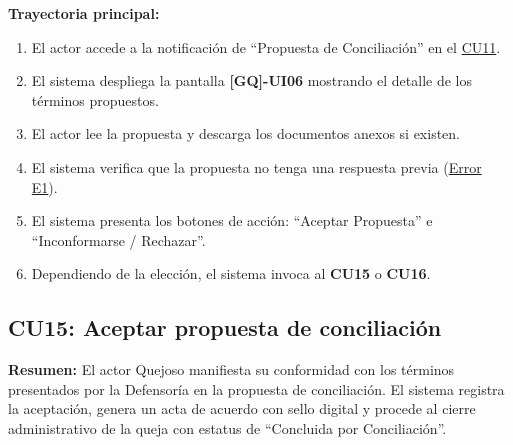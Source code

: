 \begin{appendices}
\textbf{Trayectoria principal:}
\begin{enumerate}[nosep]
    \item El actor accede a la notificación de ``Propuesta de Conciliación'' en el \hyperlink{anexo:casos_uso}{CU11}.
    \item El sistema despliega la pantalla \textbf{[GQ]-UI06} mostrando el detalle de los términos propuestos.
    \item El actor lee la propuesta y descarga los documentos anexos si existen.
    \item El sistema verifica que la propuesta no tenga una respuesta previa (\hyperlink{err:E19}{Error E1}).
    \item El sistema presenta los botones de acción: ``Aceptar Propuesta'' e ``Inconformarse / Rechazar''.
    \item Dependiendo de la elección, el sistema invoca al \textbf{CU15} o \textbf{CU16}.
\end{enumerate}


\subsection{CU15: Aceptar propuesta de conciliación}

\textbf{Resumen:} 
El actor Quejoso manifiesta su conformidad con los términos presentados por la Defensoría en la propuesta de conciliación. El sistema registra la aceptación, genera un acta de acuerdo con sello digital y procede al cierre administrativo de la queja con estatus de ``Concluida por Conciliación''.


\end{appendices}
